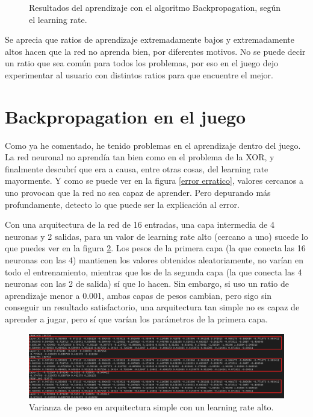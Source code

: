 \begin{figure}[H]
	\caption{Resultados del aprendizaje con el algoritmo Backpropagation, según el learning rate.}
	\label{Backpropagation cambiando learning rate}
\end{figure}

Se aprecia que ratios de aprendizaje extremadamente bajos y extremadamente altos hacen que la red no aprenda bien, por diferentes motivos. No se puede decir un ratio que sea común para todos los problemas, por eso en el juego dejo experimentar al usuario con distintos ratios para que encuentre el mejor. 

\section{Backpropagation en el juego}
Como ya he comentado, he tenido problemas en el aprendizaje dentro del juego. La red neuronal no aprendía tan bien como en el problema de la XOR, y finalmente descubrí que era a causa, entre otras cosas, del learning rate mayormente. Y como se puede ver en la figura \ref{error erratico}, valores cercanos a uno provocan que la red no sea capaz de aprender. Pero depurando más profundamente, detecto lo que puede ser la explicación al error.

Con una arquitectura de la red de 16 entradas, una capa intermedia de 4 neuronas y 2 salidas, para un valor de learning rate alto (cercano a uno) sucede lo que puedes ver en la figura \ref{alto learning rate arquitectura simple}. Los pesos de la primera capa (la que conecta las 16 neuronas con las 4) mantienen los valores obtenidos aleatoriamente, no varían en todo el entrenamiento, mientras que los de la segunda capa (la que conecta las 4 neuronas con las 2 de salida) sí que lo hacen. Sin embargo, si uso un ratio de aprendizaje menor a 0.001, ambas capas de pesos cambian, pero sigo sin conseguir un resultado satisfactorio, una arquitectura tan simple no es capaz de aprender a jugar, pero sí que varían los parámetros de la primera capa.

\begin{figure}[H]
	\centering
	\includegraphics[width=15cm]{archivos/imagenes/alto-learning-rate-arquitectura-simple.png}
	\caption{Varianza de peso en arquitectura simple con un learning rate alto.}
	\label{alto learning rate arquitectura simple}
\end{figure}

